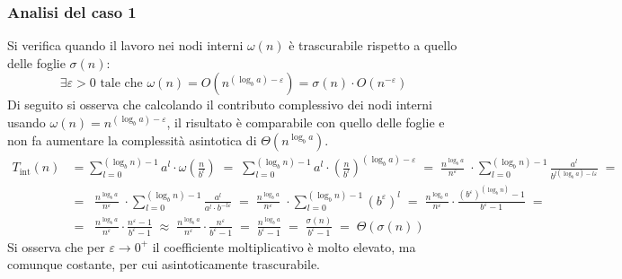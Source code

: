 \subsubsection*{Analisi del caso 1}
Si verifica quando il lavoro nei nodi interni \(\omega(n)\) è trascurabile rispetto a quello delle foglie \(\sigma(n)\):
\[\exists \varepsilon > 0 \text{ tale che } \omega(n) = O \! \left(n^{(\log_b a )- \varepsilon}\right) = \sigma(n) \cdot O \! \left(n^{-\varepsilon}\right)\]
Di seguito si osserva che calcolando il contributo complessivo dei nodi interni usando \(\omega(n) = n ^{(\log_b a) - \varepsilon}\),
il risultato è comparabile con quello delle foglie e non fa aumentare la complessità asintotica di \(\Theta(n^{\log_b a})\).
\begin{align*}
	T_{\text{int}}(n) &= \sum_{l=0}^{(\log_b n) - 1} a^l \cdot \omega \! \left( \frac{n}{b^l} \right) \; = \; \sum_{l=0}^{(\log_b n) - 1} a^l \cdot \left( \frac{n}{b^l} \right)^{(\log_b a) - \varepsilon} \; = \; \frac{n^{\log_b a}}{n^{\varepsilon}} \; \cdot \!\! \sum_{l=0}^{(\log_b n) - 1} \frac{a^l}{b^{l (\log_b a) - l \varepsilon}} \; = \\[3pt]
	&= \;\; \frac{n^{\log_b a}}{n^{\varepsilon}} \; \cdot \!\! \sum_{l=0}^{(\log_b n) - 1} \frac{a^l}{a^l \cdot b^{-l \varepsilon}} \; = \; \frac{n^{\log_b a}}{n^{\varepsilon}} \; \cdot \!\! \sum_{l=0}^{(\log_b n) - 1} {(b^{\varepsilon})}^l \; = \; \frac{n^{\log_b a}}{n^{\varepsilon}} \cdot \frac{(b^{\varepsilon})^{(\log_b n)} - 1}{b^{\varepsilon} - 1} \; = \\[3pt]
	&= \;\; \frac{n^{\log_b a}}{n^{\varepsilon}} \cdot \frac{n^{\varepsilon} - 1}{b^{\varepsilon} - 1} \; \approx \; \frac{n^{\log_b a}}{n^{\varepsilon}} \cdot \frac{n^{\varepsilon}}{b^{\varepsilon} - 1} \; = \; \frac{n^{\log_b a}}{b^{\varepsilon} - 1} \; = \; \frac{\sigma(n)}{b^{\varepsilon} - 1} \; = \; \Theta(\sigma(n))
\end{align*}
Si osserva che per \(\varepsilon \to 0^+\) il coefficiente moltiplicativo è molto elevato, ma comunque costante, per
cui asintoticamente trascurabile.

